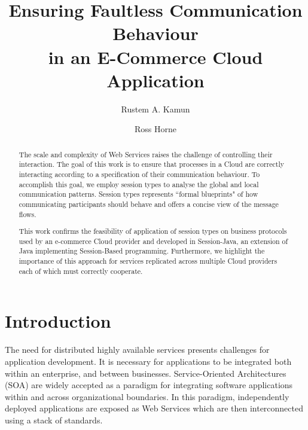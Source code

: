 \documentclass[10pt]{llncs}
\title{Ensuring Faultless Communication Behaviour\\
       in an E-Commerce Cloud Application}
\author{
	Rustem A. Kamun \and Ross Horne
}
\institute{
  Kazakh-British Technical University, 
  Faculty of Information Technology,\\
  Almaty, Kazakhstan\\
  \email{r.kamun@gmail.com}
}
\begin{document}
\maketitle

\begin{abstract}
The scale and complexity of Web Services raises the challenge of controlling their interaction. The goal of this work is to ensure that processes in a Cloud are correctly interacting according to a specification of their communication behaviour. To accomplish this goal, we employ session types to analyse the global and local communication patterns. Session types represents ``formal blueprints" of how communicating participants should behave and offers a concise view of the message flows.
  
This work confirms the feasibility of application of session types on business protocols used by an e-commerce Cloud provider and developed in Session-Java, an extension of Java implementing Session-Based programming. Furthermore, we highlight the importance of this approach for services replicated across multiple Cloud providers each of which must correctly cooperate.
\end{abstract}

\setcounter{tocdepth}{2}

\pagestyle{empty}


\section{Introduction}
\label{sect:introduction}

The need for distributed highly available services presents challenges for application development.
It is necessary for applications to be integrated both within an enterprise, and between businesses.
Service-Oriented Architectures (SOA) are widely accepted as a paradigm for integrating software applications within and across organizational boundaries.
In this paradigm, independently deployed applications are exposed as Web Services which are then 
interconnected using a stack of standards. %
		
\end{document}
